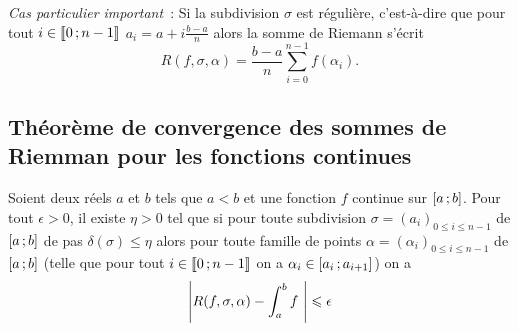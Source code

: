 \emph{Cas particulier important}~: Si la subdivision $\sigma$ est régulière, c'est-à-dire que pour tout $i \in \mathopen{\llbracket}0\mathclose{}\mathpunct{};n-1\mathclose{\rrbracket}$ $a_i=a+i \frac{b-a}{n}$ alors la somme de Riemann s'écrit
\begin{equation}
  R(f,\sigma,\alpha) = \frac{b-a}{n} \sum_{i=0}^{n-1}f(\alpha_i).
\end{equation}

\subsection{Théorème de convergence des sommes de Riemman pour les fonctions continues}

\begin{theo}
  Soient deux réels $a$ et $b$ tels que $a<b$ et une fonction $f$ continue sur $\left[ a \, ;  b \right]$. Pour tout $\epsilon >0$, il existe $\eta >0$ tel que si pour toute subdivision $\sigma=(a_i)_{0 \leqslant i \leqslant n-1}$ de $\left[ a \, ;  b \right]$ de pas $\delta(\sigma) \leqslant \eta$ alors pour toute famille de points $\alpha=(\alpha_i)_{0 \leqslant i \leqslant n-1}$ de $\left[ a \, ;  b \right]$ (telle que pour tout $i \in \mathopen{\llbracket}0\mathclose{}\mathpunct{};n-1\mathclose{\rrbracket}$ on a $\alpha_i \in \left[ a_i \, ;  a_{i+1} \right]$) on a
  \begin{equation}
    \left\lvert R(f,\sigma,\alpha)- \int_a^b f~\right\rvert \leqslant \epsilon
  \end{equation}
\end{theo}
